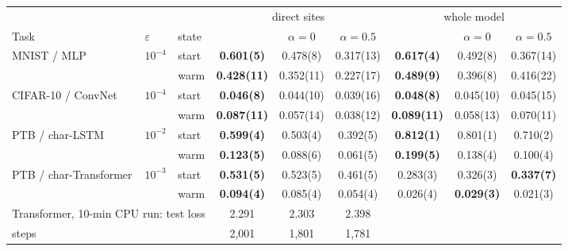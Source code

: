 \begin{tabular}{l l l ccc ccc}
\toprule
 & & & \multicolumn{3}{c}{direct sites} & \multicolumn{3}{c}{whole model} \\
\cmidrule(lr){4-6}\cmidrule(lr){7-9}
Task & $\varepsilon$ & state & \DUST{} & $\alpha=0$ & $\alpha=0.5$ & \DUST{} & $\alpha=0$ & $\alpha=0.5$ \\
\midrule
MNIST / MLP & $10^{-4}$ & start & \textbf{0.601(5)} & 0.478(8) & 0.317(13) & \textbf{0.617(4)} & 0.492(8) & 0.367(14) \\
 &  & warm & \textbf{0.428(11)} & 0.352(11) & 0.227(17) & \textbf{0.489(9)} & 0.396(8) & 0.416(22) \\
CIFAR-10 / ConvNet & $10^{-4}$ & start & \textbf{0.046(8)} & 0.044(10) & 0.039(16) & \textbf{0.048(8)} & 0.045(10) & 0.045(15) \\
 &  & warm & \textbf{0.087(11)} & 0.057(14) & 0.038(12) & \textbf{0.089(11)} & 0.058(13) & 0.070(11) \\
PTB / char-LSTM & $10^{-2}$ & start & \textbf{0.599(4)} & 0.503(4) & 0.392(5) & \textbf{0.812(1)} & 0.801(1) & 0.710(2) \\
 &  & warm & \textbf{0.123(5)} & 0.088(6) & 0.061(5) & \textbf{0.199(5)} & 0.138(4) & 0.100(4) \\
PTB / char-Transformer & $10^{-3}$ & start & \textbf{0.531(5)} & 0.523(5) & 0.461(5) & 0.283(3) & 0.326(3) & \textbf{0.337(7)} \\
 &  & warm & \textbf{0.094(4)} & 0.085(4) & 0.054(4) & 0.026(4) & \textbf{0.029(3)} & 0.021(3) \\
\midrule
\multicolumn{3}{l}{Transformer, 10-min CPU run: test loss} & 2.291 & 2.303 & 2.398 & & & \\
\multicolumn{3}{l}{\quad steps} & 2{,}001 & 1{,}801 & 1{,}781 & & & \\
\bottomrule
\end{tabular}
